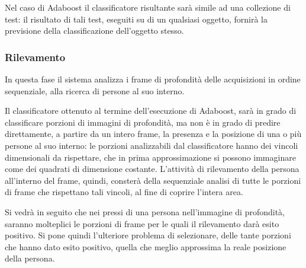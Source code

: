                Nel caso di Adaboost il classificatore risultante sarà simile ad una collezione di test: il risultato di tali test, eseguiti su di un qualsiasi oggetto, fornirà la previsione della classificazione dell'oggetto stesso.

            \subsubsection{Rilevamento}
                In questa fase il sistema analizza i frame di profondità delle acquisizioni in ordine sequenziale, alla ricerca di persone al suo interno.

                Il classificatore ottenuto al termine dell'esecuzione di Adaboost, sarà in grado di classificare porzioni di immagini di profondità, ma non è in grado di predire direttamente, a partire da un intero frame, la presenza e la posizione di una o più persone al suo interno: le porzioni analizzabili dal classificatore hanno dei vincoli dimensionali da rispettare, che in prima approssimazione si possono immaginare come dei quadrati di dimensione costante.
                L'attività di rilevamento della persona all'interno del frame, quindi, consterà della sequenziale analisi di tutte le porzioni di frame che rispettano tali vincoli, al fine di coprire l'intera area.

                Si vedrà in seguito che nei pressi di una persona nell'immagine di profondità, saranno molteplici le porzioni di frame per le quali il rilevamento darà esito positivo.
                Si pone quindi l'ulteriore problema di selezionare, delle tante porzioni che hanno dato esito positivo, quella che meglio approssima la reale posizione della persona. 
